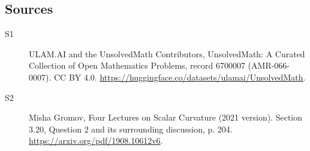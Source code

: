 \documentclass[11pt]{article}
\begin{document}
\subsection{Sources}
\begin{description}
\item[\hypertarget{source:6700007:1}{S1}] ULAM.AI and the UnsolvedMath Contributors, UnsolvedMath: A Curated Collection of Open Mathematics Problems, record 6700007 (AMR-066-0007). CC BY 4.0. \url{https://huggingface.co/datasets/ulamai/UnsolvedMath}.
\item[\hypertarget{source:6700007:2}{S2}] Misha Gromov, Four Lectures on Scalar Curvature (2021 version). Section 3.20, Question 2 and its surrounding discussion, p. 204. \url{https://arxiv.org/pdf/1908.10612v6}.
\end{description}
\label{end:6700007}
\end{document}

